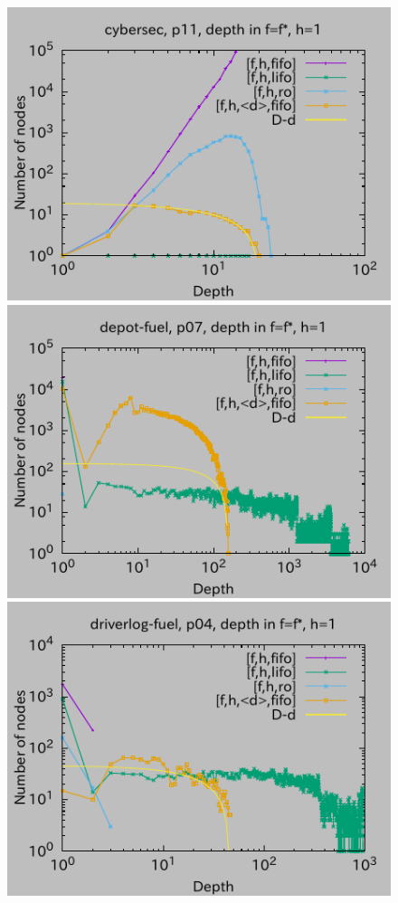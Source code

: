 \begin{figure}[htbp]
\includegraphics{img/depth1/cybersec/p11.pdf}
\includegraphics{img/depth1/depot-fuel/p07.pdf}
\includegraphics{img/depth1/driverlog-fuel/p04.pdf}

\end{figure}
